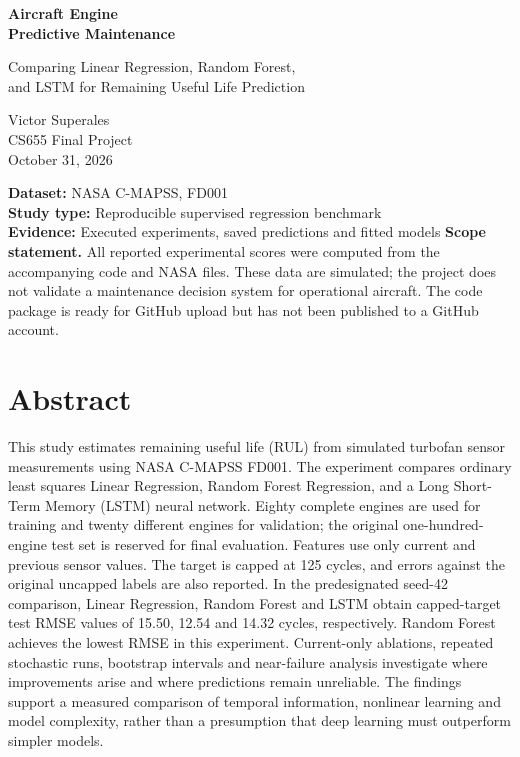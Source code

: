 \documentclass[11pt]{article}
\begin{document}
\begin{titlepage}
\vspace*{1in}
{\color{navy}\Huge\bfseries Aircraft Engine\\[8pt] Predictive Maintenance\par}
\vspace{0.35in}
{\Large Comparing Linear Regression, Random Forest,\\and LSTM for Remaining Useful Life Prediction\par}
\vspace{0.65in}
{\large Victor Superales\\CS655 Final Project\\October 31, 2026\par}
\vspace{0.6in}
\textbf{Dataset:} NASA C-MAPSS, FD001\\
\textbf{Study type:} Reproducible supervised regression benchmark\\
\textbf{Evidence:} Executed experiments, saved predictions and fitted models
\vfill
\textbf{Scope statement.} All reported experimental scores were computed from the accompanying code and NASA files. These data are simulated; the project does not validate a maintenance decision system for operational aircraft. The code package is ready for GitHub upload but has not been published to a GitHub account.
\end{titlepage}
\section*{Abstract}
This study estimates remaining useful life (RUL) from simulated turbofan sensor measurements using NASA C-MAPSS FD001. The experiment compares ordinary least squares Linear Regression, Random Forest Regression, and a Long Short-Term Memory (LSTM) neural network. Eighty complete engines are used for training and twenty different engines for validation; the original one-hundred-engine test set is reserved for final evaluation. Features use only current and previous sensor values. The target is capped at 125 cycles, and errors against the original uncapped labels are also reported. In the predesignated seed-42 comparison, Linear Regression, Random Forest and LSTM obtain capped-target test RMSE values of 15.50, 12.54 and 14.32 cycles, respectively. Random Forest achieves the lowest RMSE in this experiment. Current-only ablations, repeated stochastic runs, bootstrap intervals and near-failure analysis investigate where improvements arise and where predictions remain unreliable. The findings support a measured comparison of temporal information, nonlinear learning and model complexity, rather than a presumption that deep learning must outperform simpler models.
\end{document}
